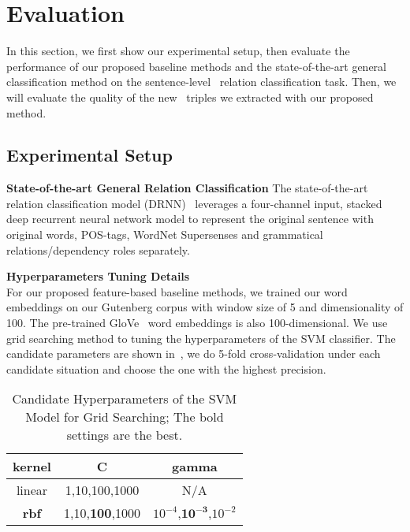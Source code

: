 \section {Evaluation}
\label{sec:eval}

In this section, we first show our experimental setup, then evaluate the performance of our proposed baseline methods and the state-of-the-art general classification method on the sentence-level \lnear~relation classification task. 
Then, we will evaluate the quality of the new \lnear~triples we extracted with our proposed method.
\subsection{Experimental Setup}
\label{sec:experiment}
\noindent
\textbf{State-of-the-art General Relation Classification} 
The state-of-the-art relation classification model (DRNN)~\cite{xu2016improved} leverages
a four-channel input, stacked deep recurrent neural network model to represent the original sentence with original words, POS-tags, WordNet Supersenses and grammatical relations/dependency roles separately. 

\noindent
\textbf{Hyperparameters Tuning Details}\\
For our proposed feature-based baseline methods, 
we trained our word embeddings on our Gutenberg corpus with window size of 5 and dimensionality of 100. 
The pre-trained GloVe~\cite{pennington2014glove} word embeddings is also 100-dimensional.
We use grid searching method to tuning the hyperparameters of the SVM classifier. The candidate parameters are shown in~, we do 5-fold cross-validation under each candidate situation and choose the one with the highest precision.

\begin{table}[th!]
\small
	\centering 
	\begin{tabular}{|c|c|c|}
		\hline
		\textbf{kernel} & \textbf{C} & \textbf{gamma} \\ \hline \hline
		linear & 1,10,{100},1000 & N/A  \\\hline
		\textbf{rbf} & 1,10,\textbf{100},1000 & $10^{-4}$,{$\mathbf{10^{-3}}$},$10^{-2}$ \\\hline
	\end{tabular}
\caption{Candidate Hyperparameters of the SVM Model for Grid Searching; The bold settings are the best.}
\label{tab:grid}
\end{table}


